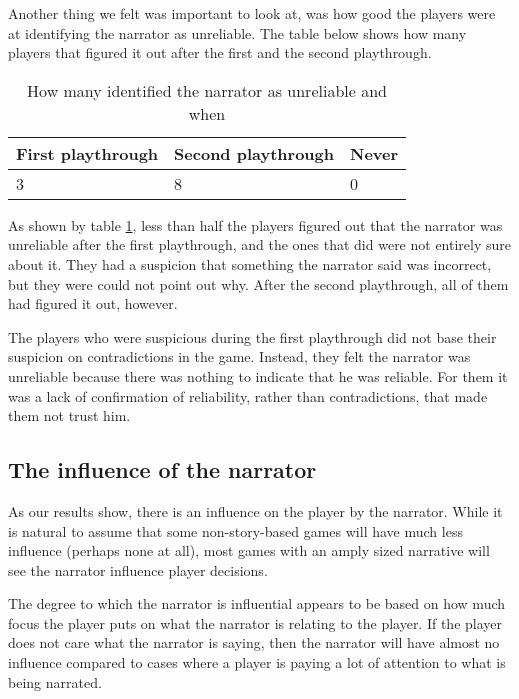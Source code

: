 Another thing we felt was important to look at, was how good the players were at identifying the narrator as unreliable. The table below shows how many players that figured it out after the first and the second playthrough.
\begin{table}
\begin{center}
\renewcommand{\arraystretch}{1.3}
\caption {How many identified the narrator as unreliable and when}
\label{table-unreliable_narrator}
\begin{tabular}{ | p{2.3cm} | p{2.3cm} | p{2.3cm} | }
  \hline                       
  \textbf{First playthrough} & \textbf{Second playthrough} & \textbf{Never} \\
  \hline  
  3 & 8 & 0 \\
  \hline  
\end{tabular} 
\end{center}
\end{table}

As shown by table \ref{table-unreliable_narrator}, less than half the players figured out that the narrator was unreliable after the first playthrough, and the ones that did were not entirely sure about it. They had a suspicion that something the narrator said was incorrect, but they were could not point out why. After the second playthrough, all of them had figured it out, however.

The players who were suspicious during the first playthrough did not base their suspicion on contradictions in the game. Instead, they felt the narrator was unreliable because there was nothing to indicate that he was reliable. For them it was a lack of confirmation of reliability, rather than contradictions, that made them not trust him.
\subsection{The influence of the narrator}
As our results show, there is an influence on the player by the narrator. While it is natural to assume that some non-story-based games will have much less influence (perhaps none at all), most games with an amply sized narrative will see the narrator influence player decisions. 

The degree to which the narrator is influential appears to be based on how much focus the player puts on what the narrator is relating to the player. If the player does not care what the narrator is saying, then the narrator will have almost no influence compared to cases where a player is paying a lot of attention to what is being narrated.

